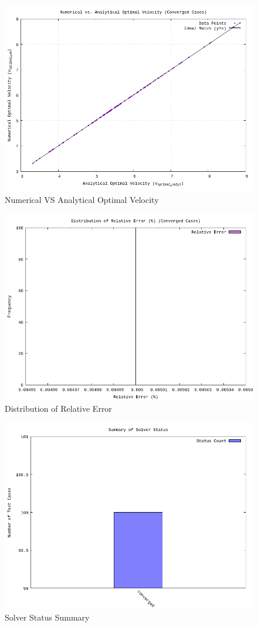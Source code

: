 \documentclass[conference]{IEEEtran}
\begin{document}
\begin{figure}[H]
    \centering
    \includegraphics[width=0.75\linewidth]{../Gambar/plot_numerical_vs_analytical_velocity.png}
    \caption{Numerical VS Analytical Optimal Velocity}
    \label{fig:numerical-vs-analytical}
\end{figure}

\begin{figure}[H]
    \centering
    \includegraphics[width=0.75\linewidth]{../Gambar/plot_relative_error_distribution.png}
    \caption{Distribution of Relative Error}
    \label{fig:relative-error-distribution}
\end{figure}

\begin{figure}[H]
    \centering
    \includegraphics[width=0.75\linewidth]{../Gambar/plot_solver_status_summary.png}
    \caption{Solver Status Summary}
    \label{fig:solver-status-summary}
\end{figure}
\end{document}
